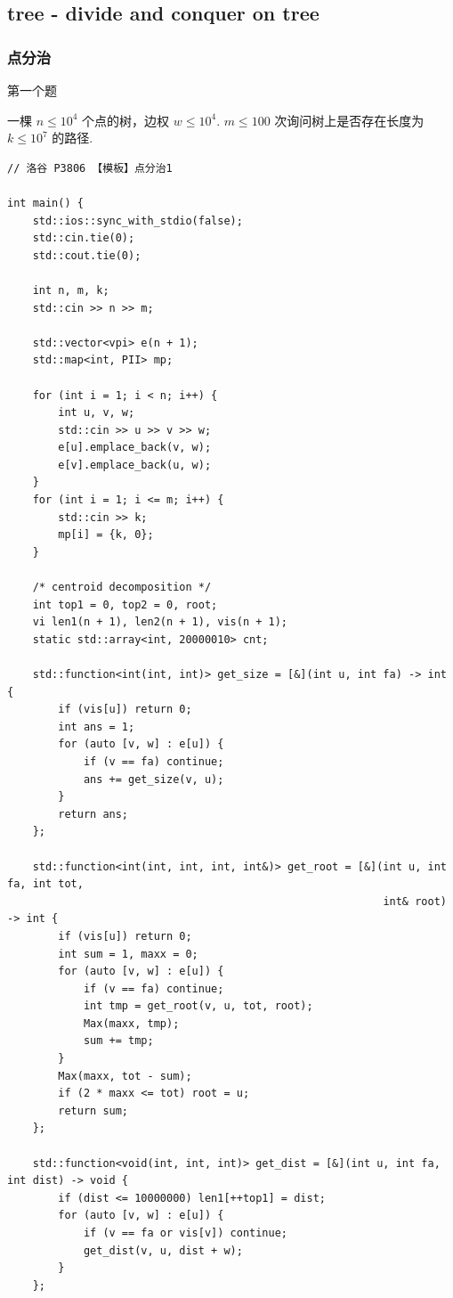 \documentclass[UTF8, a4paper, titlepage, twoside]{ctexart}
\begin{document}
\subsection{ tree - divide and conquer on tree }
\subsubsection*{ 点分治 }
第一个题

一棵 \(n \leqslant 10^4\) 个点的树，边权 \(w \leqslant 10^4\). \(m \leqslant 100\) 次询问树上是否存在长度为 \(k \leqslant 10^7\) 的路径.

\begin{lstlisting}[style=cpp]
// 洛谷 P3806 【模板】点分治1

int main() {
    std::ios::sync_with_stdio(false);
    std::cin.tie(0);
    std::cout.tie(0);

    int n, m, k;
    std::cin >> n >> m;

    std::vector<vpi> e(n + 1);
    std::map<int, PII> mp;

    for (int i = 1; i < n; i++) {
        int u, v, w;
        std::cin >> u >> v >> w;
        e[u].emplace_back(v, w);
        e[v].emplace_back(u, w);
    }
    for (int i = 1; i <= m; i++) {
        std::cin >> k;
        mp[i] = {k, 0};
    }

    /* centroid decomposition */
    int top1 = 0, top2 = 0, root;
    vi len1(n + 1), len2(n + 1), vis(n + 1);
    static std::array<int, 20000010> cnt;

    std::function<int(int, int)> get_size = [&](int u, int fa) -> int {
        if (vis[u]) return 0;
        int ans = 1;
        for (auto [v, w] : e[u]) {
            if (v == fa) continue;
            ans += get_size(v, u);
        }
        return ans;
    };

    std::function<int(int, int, int, int&)> get_root = [&](int u, int fa, int tot,
                                                           int& root) -> int {
        if (vis[u]) return 0;
        int sum = 1, maxx = 0;
        for (auto [v, w] : e[u]) {
            if (v == fa) continue;
            int tmp = get_root(v, u, tot, root);
            Max(maxx, tmp);
            sum += tmp;
        }
        Max(maxx, tot - sum);
        if (2 * maxx <= tot) root = u;
        return sum;
    };

    std::function<void(int, int, int)> get_dist = [&](int u, int fa, int dist) -> void {
        if (dist <= 10000000) len1[++top1] = dist;
        for (auto [v, w] : e[u]) {
            if (v == fa or vis[v]) continue;
            get_dist(v, u, dist + w);
        }
    };


\end{lstlisting}
\end{document}
